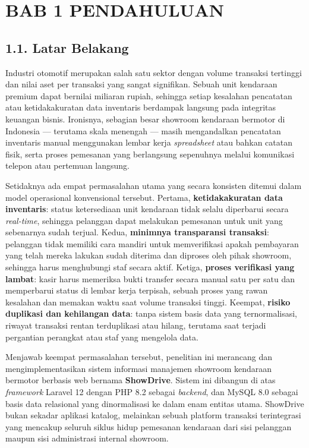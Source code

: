 \documentclass[11pt, a5paper]{article}
\begin{document}
\section*{BAB 1 PENDAHULUAN}

\subsection*{1.1. Latar Belakang}

Industri otomotif merupakan salah satu sektor dengan volume transaksi tertinggi
dan nilai aset per transaksi yang sangat signifikan. Sebuah unit kendaraan
premium dapat bernilai miliaran rupiah, sehingga setiap kesalahan pencatatan
atau ketidakakuratan data inventaris berdampak langsung pada integritas keuangan
bisnis. Ironisnya, sebagian besar showroom kendaraan bermotor di Indonesia —
terutama skala menengah — masih mengandalkan pencatatan inventaris manual
menggunakan lembar kerja \textit{spreadsheet} atau bahkan catatan fisik, serta
proses pemesanan yang berlangsung sepenuhnya melalui komunikasi telepon atau
pertemuan langsung.

Setidaknya ada empat permasalahan utama yang secara konsisten ditemui dalam
model operasional konvensional tersebut. Pertama, \textbf{ketidakakuratan data
inventaris}: status ketersediaan unit kendaraan tidak selalu diperbarui secara
\textit{real-time}, sehingga pelanggan dapat melakukan pemesanan untuk unit yang
sebenarnya sudah terjual. Kedua, \textbf{minimnya transparansi transaksi}:
pelanggan tidak memiliki cara mandiri untuk memverifikasi apakah pembayaran yang
telah mereka lakukan sudah diterima dan diproses oleh pihak showroom, sehingga
harus menghubungi staf secara aktif. Ketiga, \textbf{proses verifikasi yang
lambat}: kasir harus memeriksa bukti transfer secara manual satu per satu dan
memperbarui status di lembar kerja terpisah, sebuah proses yang rawan kesalahan
dan memakan waktu saat volume transaksi tinggi. Keempat, \textbf{risiko duplikasi
dan kehilangan data}: tanpa sistem basis data yang ternormalisasi, riwayat
transaksi rentan terduplikasi atau hilang, terutama saat terjadi pergantian
perangkat atau staf yang mengelola data.

Menjawab keempat permasalahan tersebut, penelitian ini merancang dan
mengimplementasikan sistem informasi manajemen showroom kendaraan bermotor
berbasis web bernama \textbf{ShowDrive}. Sistem ini dibangun di atas
\textit{framework} Laravel 12 dengan PHP 8.2 sebagai \textit{backend}, dan
MySQL 8.0 sebagai basis data relasional yang dinormalisasi ke dalam enam entitas
utama. ShowDrive bukan sekadar aplikasi katalog, melainkan sebuah platform
transaksi terintegrasi yang mencakup seluruh siklus hidup pemesanan kendaraan
dari sisi pelanggan maupun sisi administrasi internal showroom.
\end{document}
